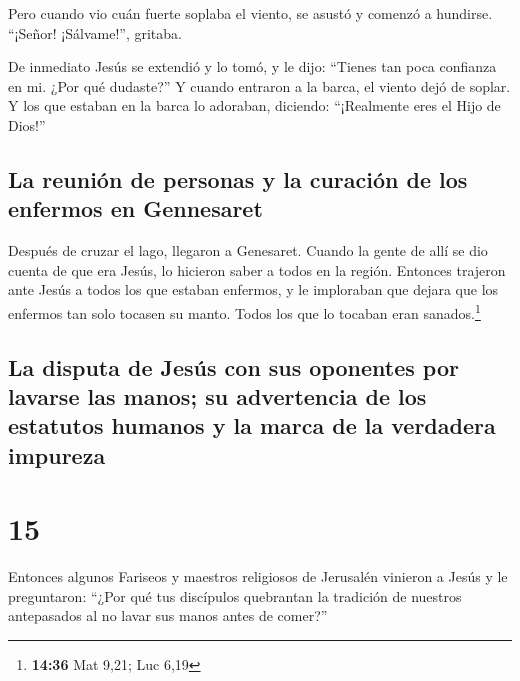  Pero cuando vio cuán fuerte soplaba el viento, se asustó
y comenzó a hundirse. ``¡Señor! ¡Sálvame!'', gritaba.

 De inmediato Jesús se extendió y lo tomó, y le dijo:
``Tienes tan poca confianza en mi. ¿Por qué dudaste?''  Y
cuando entraron a la barca, el viento dejó de soplar.  Y
los que estaban en la barca lo adoraban, diciendo: ``¡Realmente eres el
Hijo de Dios!''

\hypertarget{la-reuniuxf3n-de-personas-y-la-curaciuxf3n-de-los-enfermos-en-gennesaret}{%
\subsection{La reunión de personas y la curación de los enfermos en
Gennesaret}\label{la-reuniuxf3n-de-personas-y-la-curaciuxf3n-de-los-enfermos-en-gennesaret}}

 Después de cruzar el lago, llegaron a Genesaret.
 Cuando la gente de allí se dio cuenta de que era Jesús,
lo hicieron saber a todos en la región. Entonces trajeron ante Jesús a
todos los que estaban enfermos,  y le imploraban que
dejara que los enfermos tan solo tocasen su manto. Todos los que lo
tocaban eran sanados.\footnote{\textbf{14:36} Mat 9,21; Luc 6,19}

\hypertarget{la-disputa-de-jesuxfas-con-sus-oponentes-por-lavarse-las-manos-su-advertencia-de-los-estatutos-humanos-y-la-marca-de-la-verdadera-impureza}{%
\subsection{La disputa de Jesús con sus oponentes por lavarse las manos;
su advertencia de los estatutos humanos y la marca de la verdadera
impureza}\label{la-disputa-de-jesuxfas-con-sus-oponentes-por-lavarse-las-manos-su-advertencia-de-los-estatutos-humanos-y-la-marca-de-la-verdadera-impureza}}

\hypertarget{section-14}{%
\section{15}\label{section-14}}

 Entonces algunos Fariseos y maestros religiosos de
Jerusalén vinieron a Jesús y le preguntaron:  ``¿Por qué
tus discípulos quebrantan la tradición de nuestros antepasados al no
lavar sus manos antes de comer?''

